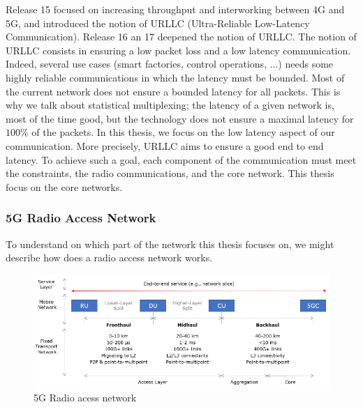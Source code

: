 \documentclass[a4paper,10pt]{article}
\begin{document}
Release 15 focused on increasing throughput and interworking between 4G and 5G, and introduced the notion of URLLC (Ultra-Reliable Low-Latency Communication). Release 16 an 17 deepened the notion of URLLC. The notion of URLLC consists in ensuring a low packet loss and a low latency communication. Indeed, several use cases (smart factories, control operations, ...) needs some highly reliable communications in which the latency must be bounded. Most of the current network does not ensure a bounded latency for all packets. This is why we talk about statistical multiplexing; the latency of a given network is, most of the time good, but the technology does not ensure a maximal latency for $100\%$ of the packets.  In this thesis, we focus on the low latency aspect of our communication. More precisely, URLLC aims to ensure a good end to end latency. To achieve such a goal, each component of the communication must meet the constraints, the radio communications, and the core network. This thesis focus on the core networks. 

\subsubsection{5G Radio Access Network}
To understand on which part of the network this thesis focuses on, we might describe how does a radio access network works.

 \begin{figure}[h]
      \begin{center}
      \includegraphics[width=1\textwidth]{5gran.png}
      \end{center}
      \caption{5G Radio acess network}\label{fig:5gran}
      \end{figure}
\end{document}

